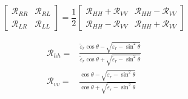 \documentclass[draftcls,onecolumn]{IEEEtran}  %
\begin{document}
\begin{equation}
	\begin{bmatrix}
	\mathcal{R}_{RR} & \mathcal{R}_{RL} \\
	\mathcal{R}_{LR} & \mathcal{R}_{LL}
	\end{bmatrix} = 
	\frac{1}{2}
	\begin{bmatrix}
	\mathcal{R}_{HH} + \mathcal{R}_{VV} & \mathcal{R}_{HH} - \mathcal{R}_{VV} \\
	\mathcal{R}_{HH} - \mathcal{R}_{VV} & \mathcal{R}_{HH} + \mathcal{R}_{VV}		\end{bmatrix}
\end{equation}

\begin{equation} 
\begin{split}
	{\mathcal{R}_{hh}} = {}& \frac{{{{\tilde \varepsilon }_r}\cos \theta  - \sqrt 				{{{\tilde \varepsilon }_r} - {{\sin }^2}\theta } }}{{{{\tilde \varepsilon}_r}				\cos \theta  + \sqrt {{{\tilde \varepsilon }_r} - {{\sin }^2}\theta }}}
\\
	{\mathcal{R}_{vv}} = {}& \frac{{\cos \theta  - \sqrt {{{\tilde \varepsilon }_r} - {{\sin }^2}\theta } }}{{\cos \theta  + \sqrt {{{\tilde \varepsilon }_r} - {{\sin }^2}\theta }}} 
    \end{split}
     \label{Eq: reflectivity_di}
\end{equation}
\end{document}
